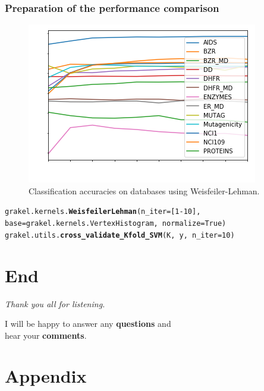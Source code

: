 \begin{frame}
	\frametitle{Preparation of the performance comparison}	
	\begin{figure}
		\centering
		\includegraphics[width=0.6\linewidth]{images/plot_whiteText}
		\caption{Classification accuracies on databases using Weisfeiler-Lehman.}
		\label{fig:plot}
	\end{figure}
	\tiny{\texttt{grakel.kernels.\textbf{WeisfeilerLehman}(n\_iter=[1-10], base=grakel.kernels.VertexHistogram, normalize=True)}}\\
	\tiny{\texttt{grakel.utils.\textbf{cross\_validate\_Kfold\_SVM}(K, y, n\_iter=10)}}
\end{frame}

\section{End}

\begin{frame}[c]
	\centering %
	\begin{huge}
		\emph{Thank you all for listening.}\\
	\end{huge}
	\vspace{2 cm}
	I will be happy to answer any \textbf{questions} and\\
	hear your \textbf{comments}.
\end{frame}

\appendix
\section{Appendix}

